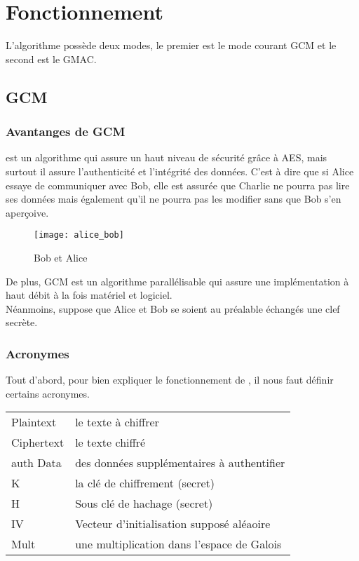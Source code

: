 \chapter{Fonctionnement}
\label{chap:fonctionnement}

L'algorithme \aes possède deux modes, le premier est le mode courant GCM et le second est le GMAC.

\section{GCM}

\subsection{Avantanges de GCM}

\aes est un algorithme qui assure un haut niveau de sécurité grâce à AES, mais surtout il assure l'authenticité et l'intégrité des données. C'est à dire que si Alice essaye de communiquer avec Bob, elle est assurée que Charlie ne pourra pas lire ses données mais également qu'il ne pourra pas les modifier sans que Bob s'en aperçoive. 

\begin{figure}[!h]
  \centering
  \texttt{[image: alice\_bob]}
  \caption{Bob et Alice}
  \label{Bob et Alice}
\end{figure}


De plus, GCM est un algorithme parallélisable qui assure une implémentation à haut débit à la fois matériel et logiciel.
~\\

Néanmoins, \aes suppose que Alice et Bob se soient au préalable échangés une clef secrète.

\subsection{Acronymes}


Tout d'abord, pour bien expliquer le fonctionnement de \aes, il nous faut définir certains acronymes.

\begin{center}
  \begin{tabular}[h]{|l|l|}
    \hline
    Plaintext&le texte à chiffrer\\
    Ciphertext&le texte chiffré\\
    auth Data&des données supplémentaires à authentifier\\
    K&la clé de chiffrement (secret)\\
    H&Sous clé de hachage (secret)\\
    IV& Vecteur d'initialisation supposé aléaoire\\
    Mult&une multiplication dans l'espace de Galois\\
    \hline
  \end{tabular}
\end{center}


